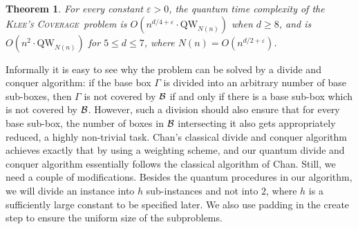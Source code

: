 \documentclass[12pt]{article}
\newcommand{\qw}{\mathrm{QW}}
\newcommand{\KCf}{\textsc{Klee's Coverage}}
\newtheorem{theorem}{Theorem}
\theoremstyle{definition}
\begin{document}
\begin{theorem}
\label{thm:klee}
For every constant $\varepsilon > 0$, the quantum time complexity of the \KCf \ problem is $O(n^{d/4 + \varepsilon} \cdot \qw_{N(n)})$ when $d \geq 8$, and is $O(n^2 \cdot \qw_{N(n)})$ for $5 \leq d \leq 7$, where $N(n) = O(n^{d/2 + \varepsilon})$.
\end{theorem}

Informally it is easy to see why the problem can be solved by a divide and conquer algorithm: if the base box $\Gamma$ is divided into an arbitrary number of base sub-boxes, then $\Gamma$ is not covered by ${\cal B}$ if and only if there is a base sub-box which is not covered by ${\cal B}$. However, such a division should also ensure that for every base sub-box, the number of boxes in ${\cal B}$ intersecting it also gets appropriately reduced, a highly non-trivial task. Chan's classical divide and conquer algorithm achieves exactly that by using a weighting scheme, and our quantum divide and conquer algorithm essentially follows the classical algorithm of Chan. Still, we need a couple of modifications.
Besides the quantum procedures in our algorithm, we will divide an instance into $h$ sub-instances and not into $2$, where $h$ is a sufficiently large constant to be specified later. We also use padding in the create step to ensure the uniform size of the subproblems. 
\end{document}
